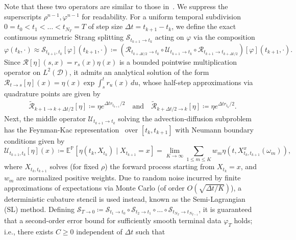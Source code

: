 \documentclass[10pt,a4paper]{article}
\begin{document}
Note that these two operators are similar to those in~\cite{Eldesoukey2026MeanFieldSinkhorn}. We suppress the superscripts $\rho^{n-1}, \varphi^{n-1}$ for readability. For a uniform temporal subdivision $0 = t_0 < t_1 < \dots < t_{N_T} = T$ of step size $\Delta t = t_{k+1} - t_k$, we define the exact continuous symmetric Strang splitting $\mathcal{S}_{t_{k+1}\to t_k}$ acting on $\varphi$ via the composition
\begin{equation}
\varphi(t_k, \cdot) \approx \mathcal{S}_{t_{k+1}, t_k}[\varphi](t_{k+1}, \cdot) \coloneq \left(\mathcal{R}_{t_{k+\Delta t/2}\to t_k} \circ \mathcal{U}_{t_{k+1}\to t_k} \circ \mathcal{R}_{t_{k+1}\to t_{k+\Delta t/2}}\right)[\varphi](t_{k+1}, \cdot).
\end{equation}%
Since $\mathcal{R}[\eta](s,x) = r_s(x)\eta(x)$ is a bounded pointwise multiplication operator on $L^2(\mathcal{D})$, it admits an analytical solution of the form $\mathcal{R}_{t\to s}[\eta](x) = \eta(x)\exp\int_s^t r_u(x)\,du$, whose half-step approximations via quadrature points are given by
\begin{equation}
\begin{aligned}
\tilde{\mathcal{R}}_{k+1\to k+\Delta t/2}[\eta] \coloneq \eta e^{\Delta t r_{t_{k+1}}/2} \quad \text{and} \quad \tilde{\mathcal{R}}_{k+\Delta t/2\to k}[\eta] \coloneq \eta e^{\Delta t r_{t_k}/2}.
\end{aligned}
\end{equation}%
Next, the middle operator $\mathcal{U}_{t_{k+1}\to t_k}$ solving the advection-diffusion subproblem has the Feynman-Kac representation~\cite{milstein2000numerical} over $[t_k, t_{k+1}]$ with Neumann boundary conditions given by
\begin{equation}
\mathcal{U}_{t_{k+1}, t_k}[\eta](x) \coloneq \mathbb{E}^{\mathbb{P}}\left[\eta(t_k, X_{t_k}) \mid X_{t_{k+1}} = x\right] = \lim_{K\to\infty} \sum_{1 \leqslant m \leqslant K} w_m \eta\left(t, X_{t_k, t_{k+1}}^x(\omega_m)\right),
\end{equation}%
where $X_{t_k, t_{k+1}}$ solves (for fixed $\rho$) the forward process starting from $X_{t_k} = x$, and $w_m$ are normalized positive weights. Due to random noise incurred by finite approximations of expectations via Monte Carlo (of order $O(\sqrt{\Delta t / K})$), a deterministic cubature stencil is used instead, known as the Semi-Lagrangian (SL) method. Defining $\mathcal{S}_{T\to 0} \coloneq \mathcal{S}_{t_1\to t_0} \circ \mathcal{S}_{t_2\to t_1} \circ \dots \circ \mathcal{S}_{t_{N_T}\to t_{N_{T-1}}}$, it is guaranteed~\cite{BatkaiCsomosFarkasNickel2011} that a second-order error bound for sufficiently smooth terminal data $\varphi_T$ holds; i.e., there exists $C \geqslant 0$ independent of $\Delta t$ such that
\end{document}
